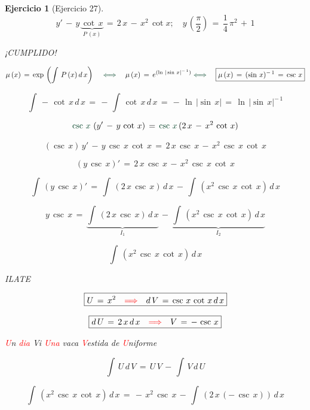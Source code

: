 \documentclass[a4paper,11pt]{book}
\newtheorem{ejer}{Ejercicio}[section]
\begin{document}
\begin{ejer}[Ejercicio 27] 

$$y'\,-\,y\,\underbrace{\cot\,x}_{P\,(x)}\,=\,2\,x\,-\,x^{2}\,\cot{x}; \quad y\,\left(\dfrac{\pi}{2} \right)\,=\,\dfrac{1}{4}\,\pi^{2}\,+\,1$$ 

¡CUMPLIDO! 


 $$\mu\,(x)\,=\,\exp\,\left(\int\,P\,(x)\,d\,x \right) \quad \textcolor{britishracinggreen}{\iff} \quad \mu\,(x)\,=\,e^{(\ln\,|\sin\,x|^{-\,1})} \textcolor{britishracinggreen}{\iff} \quad \boxed{\mu\,(x)\,=\,(\sin\,x)^{-\,1}\,=\,\csc\,x}$$ 

$$\int\,-\,\cot\,x\,d\,x\,=\,-\,\int\,\cot\,x\,d\,x\,=\,-\,\ln\,|\sin\,x|\,=\,\boxed{\ln\,|\sin\,x|^{-\,1}}$$ 

 $$\textcolor{britishracinggreen}{\csc\,x}\,\left(y'\,-\,y\,\cot\,x \right)\,=\,\textcolor{britishracinggreen}{\csc\,x}\,(2\,x\,-\,x^{2}\,\cot\,x) $$ 

$$(\csc\,x)\,y'\,-\,y\,\csc\,x\,\cot\,x\,=\,2\,x\,\csc\,x\,-\,x^{2}\,\csc\,x\,\cot\,x$$ 

$$\left(y\,\csc\,x \right)'\,=\,2\,x\,\csc\,x\,-\,x^{2}\,\csc\,x\,\cot\,x $$

 $$\int\,\left(y\,\csc\,x \right)'\,=\,\int\,\left( 2\,x\,\csc\,x \right)\,d\,x\,-\,\int\,\left(x^{2}\,\csc\,x\,\cot\,x \right)\,d\,x$$ 

$$y\,\csc\,x\,=\,\underbrace{\int\,\left( 2\,x\,\csc\,x \right)\,d\,x}_{I_{1}}\,-\,\underbrace{\int\,\left(x^{2}\,\csc\,x\,\cot\,x \right)\,d\,x}_{I_{2}}$$ 

\begin{tcolorbox}[colback=red!5!white,colframe=red!75!black,fonttitle=\bfseries,title=$I_{2}$]  

$$\int\,\left(x^{2}\,\csc\,x\,\cot\,x \right)\,d\,x$$ 

ILATE 

$$\boxed{U\,=\,x^{2} \quad \textcolor{red}{\Longrightarrow} \quad d\,V\,=\,\csc\,x\,\cot\,x\,d\,x }$$ 

$$\boxed{d\,U\,=\,2\,x\,d\,x \quad \textcolor{red}{\Longrightarrow} \quad V\,=\,-\,\csc\,x }$$ 

\textcolor{red}{U}n \textcolor{red}{dia} Vi \textcolor{red}{Una} vaca \textcolor{red}{V}estida de \textcolor{red}{U}niforme      

$$\int\,U\,d\,V\,=\,U\,V\,-\,\int\,V\,d\,U$$ 

$$\int\,\left(x^{2}\,\csc\,x\,\cot\,x \right)\,d\,x\,=\,-\,x^{2}\,\csc\,x\,-\,\int\,\left(2\,x\,(-\,\csc\,x) \right)\,d\,x$$ 


\end{tcolorbox}
\end{ejer}
\end{document}
